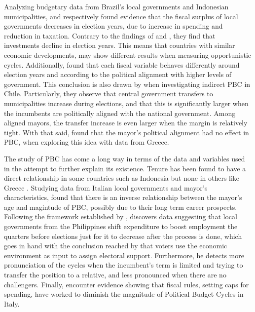 Analyzing budgetary data from Brazil's local governments and Indonesian municipalities, \textcite{sarukai2010} and \textcite{setiawan2017} respectively found evidence that the fiscal surplus of local governments decreases in election years, due to increase in spending and reduction in taxation. Contrary to the findings of \textcite{veiga2007} and \textcite{drazen2010}, they find that investments decline in election years. This means that countries with similar economic developments, may show different results when measuring opportunistic cycles. Additionally, \textcite{sarukai2010} found that each fiscal variable behaves differently around election years and according to the political alignment with higher levels of government. This conclusion is also drawn by \textcite{corvalan2018} when investigating indirect PBC in Chile. Particularly, they observe that central government transfers to municipalities increase during elections, and that this is significantly larger when the incumbents are politically aligned with the national government. Among aligned mayors, the transfer increase is even larger when the margin is relatively tight. With that said, \textcite{chortareas2016} found that the mayor's political alignment had no effect in PBC, when exploring this idea with data from Greece.

The study of PBC has come a long way in terms of the data and variables used in the attempt to further explain its existence. Tenure has been found to have a direct relationship in some countries such as Indonesia \parencite{sarukai2010} but none in others like Greece \parencite{chortareas2016}. Studying data from Italian local governments and mayor's characteristics, \textcite{alesina2018} found that there is an inverse relationship between the mayor's age and magintude of PBC, possibly due to their long term career prospects. Following the framework established by \textcite{nordhaus1975}, \textcite{labonne2016} discovers data suggesting that local governments from the Philippines shift expenditure to boost employment the quarters before elections just for it to decrease after the process is done, which goes in hand with the conclusion reached by \textcite{alfaro2019} that voters use the economic environment as input to assign electoral support. Furthermore, he detects more pronunciation of the cycles when the incumbent’s term is limited and trying to transfer the position to a relative, and less pronounced when there are no challengers. Finally, \textcite{bonfatti2019} encounter evidence showing that fiscal rules, setting caps for spending, have worked to diminish the magnitude of Political Budget Cycles in Italy.

